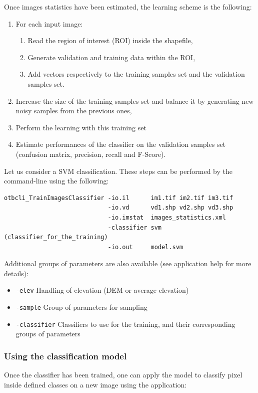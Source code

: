 Once images statistics have been estimated, the learning scheme is the following:
\begin{enumerate}
  \item For each input image:
  \begin{enumerate}
    \item Read the region of interest (ROI) inside the shapefile,
    \item Generate validation and training data within the ROI,
    \item Add vectors respectively to the training samples set and the validation
    samples set.
  \end{enumerate}
  \item Increase the size of the training samples set and balance it by
  generating new noisy samples from the previous ones,
  \item Perform the learning with this training set
  \item Estimate performances of the classifier on the validation samples set
  (confusion matrix, precision, recall and F-Score).
\end{enumerate}

Let us consider a SVM classification. These steps can be performed by the 
 command-line using the following:

\begin{verbatim}
otbcli_TrainImagesClassifier -io.il      im1.tif im2.tif im3.tif
                             -io.vd      vd1.shp vd2.shp vd3.shp
                             -io.imstat  images_statistics.xml
                             -classifier svm (classifier_for_the_training)
                             -io.out     model.svm
\end{verbatim}

Additional groups of parameters are also available (see application help for
more details):
\begin{itemize}
\item \verb?-elev? Handling of elevation (DEM or average elevation)
\item \verb?-sample? Group of parameters for sampling
\item \verb?-classifier? Classifiers to use for the training, and their corresponding groups of parameters
\end{itemize}


\subsubsection{Using the classification model}
Once the classifier has been trained, one can apply the model to classify
pixel inside defined classes on a new image using the
 application:

